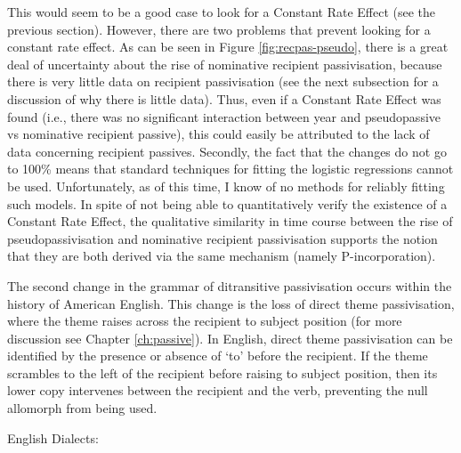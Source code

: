 	This would seem to be a good case to look for a Constant Rate Effect (see the previous section). However, there are two problems that prevent looking for a constant rate effect. As can be seen in Figure \ref{fig:recpas-pseudo}, there is a great deal of uncertainty about the rise of nominative recipient passivisation, because there is very little data on recipient passivisation (see the next subsection for a discussion of why there is little data). Thus, even if a Constant Rate Effect was found (i.e., there was no significant interaction between year and pseudopassive vs nominative recipient passive), this could easily be attributed to the lack of data concerning recipient passives. Secondly, the fact that the changes do not go to 100\% means that standard techniques for fitting the logistic regressions cannot be used. Unfortunately, as of this time, I know of no methods for reliably fitting such models. In spite of not being able to quantitatively verify the existence of a Constant Rate Effect, the qualitative similarity in time course between the rise of pseudopassivisation and nominative recipient passivisation supports the notion that they are both derived via the same mechanism (namely P-incorporation).

	The second change in the grammar of ditransitive passivisation occurs within the history of American English. This change is the loss of direct theme passivisation, where the theme raises across the recipient to subject position (for more discussion see Chapter \ref{ch:passive}). In English, direct theme passivisation can be identified by the presence or absence of `to' before the recipient. If the theme scrambles to the left of the recipient before raising to subject position, then its lower copy intervenes between the recipient and the verb, preventing the null allomorph from being used. 

\begin{exe}
	 English Dialects:
		\begin{xlist}
		\end{xlist}
\end{exe}
	
